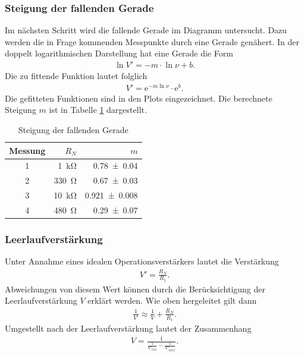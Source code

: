 \subsubsection{Steigung der fallenden Gerade}
Im nächsten Schritt wird die fallende Gerade im Diagramm untersucht.
Dazu werden die in Frage kommenden Messpunkte durch eine Gerade genähert.
In der doppelt logarithmischen Darstellung hat eine Gerade die Form
\begin{align}
	\ln V' = -m \cdot \ln \nu + b.
\end{align}
Die zu fittende Funktion lautet folglich
\begin{align}
	V' = \text{e}^{-m \ln \nu} \cdot \text{e}^b.
\end{align}
Die gefitteten Funktionen sind in den Plots eingezeichnet.
Die berechnete Steigung $m$ ist in Tabelle \ref{tab:m} dargestellt.
\begin{table}
	\centering
	\begin{tabular}{c r r}
		\toprule
		Messung & $R_N$ & $m$ \\
		\midrule
		1 & \SI{1}{\kilo \ohm} & \SI{0.78 \pm 0.04}{} \\
		2 & \SI{330}{\ohm} & \SI{0.67 \pm 0.03}{} \\
		3 & \SI{10}{\kilo \ohm} & \SI{0.921 \pm 0.008}{} \\
		4 & \SI{480}{\ohm} & \SI{0.29 \pm 0.07}{} \\
		\bottomrule
	\end{tabular}
	\caption{Steigung der fallenden Gerade}
	\label{tab:m}
\end{table}

\subsubsection{Leerlaufverstärkung}
Unter Annahme eines idealen Operationsverstärkers lautet die Verstärkung
\begin{align}
	V' = \frac{R_N}{R_1}.
\end{align}
Abweichungen von diesem Wert können durch die Berücksichtigung der Leerlaufverstärkung $V$ erklärt werden.
Wie oben hergeleitet gilt dann
\begin{align}
	\frac{1}{V'} \approx \frac{1}{V} + \frac{R_N}{R_1}.
\end{align}
Umgestellt nach der Leerlaufverstärkung lautet der Zusammenhang
\begin{align}
	V = \frac{1}{\frac{1}{V'_\text{real}} - \frac{1}{V'_\text{ideal}}}.
\end{align}

